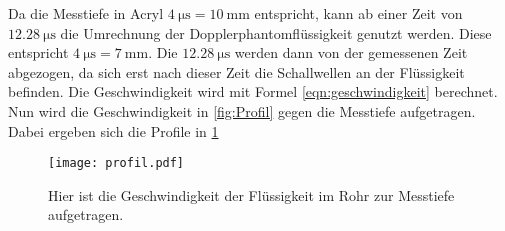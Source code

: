 Da die Messtiefe in Acryl $\qty{4}{\micro\second}=\qty{10}{\milli\meter}$ entspricht, kann ab einer Zeit von $\qty{12.28}{\micro\second}$ die Umrechnung der Dopplerphantomflüssigkeit genutzt werden.
Diese entspricht $\qty{4}{\micro\second}=\qty{7}{\milli\meter}$.
Die $\qty{12.28}{\micro\second}$ werden dann von der gemessenen Zeit abgezogen, da sich erst nach dieser Zeit die Schallwellen an der Flüssigkeit befinden.
Die Geschwindigkeit wird mit Formel \ref{eqn:geschwindigkeit} berechnet.
Nun wird die Geschwindigkeit in \ref{fig:Profil} gegen die Messtiefe aufgetragen.
Dabei ergeben sich die Profile in \ref{fig:Profile}
\begin{figure}
  \centering
  \texttt{[image: profil.pdf]}
  \caption{Hier ist die Geschwindigkeit der Flüssigkeit im Rohr zur Messtiefe aufgetragen.}
  \label{fig:Profile}
\end{figure}
